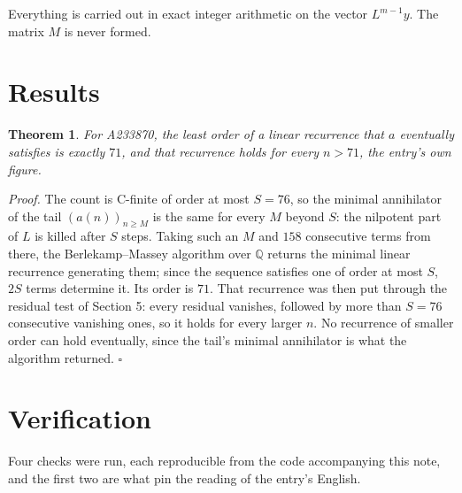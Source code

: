 \documentclass[11pt]{article}
\newtheorem{theorem}{Theorem}
\theoremstyle{definition}
\begin{document}
Everything is carried out in exact integer arithmetic on the vector $L^{m-1}y$. The matrix $M$ is never formed.

\section{Results}

\begin{theorem} For A233870, the least order of a linear recurrence that $a$ eventually satisfies is exactly $71$, and that recurrence holds for every $n > 71$, the entry's own figure.\end{theorem}

{\itshape Proof.} The count is C-finite of order at most $S = 76$, so the minimal annihilator of the tail $(a(n))_{n \ge M}$ is the same for every $M$ beyond $S$: the nilpotent part of $L$ is killed after $S$ steps. Taking such an $M$ and $158$ consecutive terms from there, the Berlekamp--Massey algorithm over $\mathbb{Q}$ returns the minimal linear recurrence generating them; since the sequence satisfies one of order at most $S$, $2S$ terms determine it. Its order is $71$. That recurrence was then put through the residual test of Section 5: every residual vanishes, followed by more than $S = 76$ consecutive vanishing ones, so it holds for every larger $n$. No recurrence of smaller order can hold eventually, since the tail's minimal annihilator is what the algorithm returned. $\square$

\section{Verification}

Four checks were run, each reproducible from the code accompanying this note, and the first two are what pin the reading of the entry's English.
\end{document}
